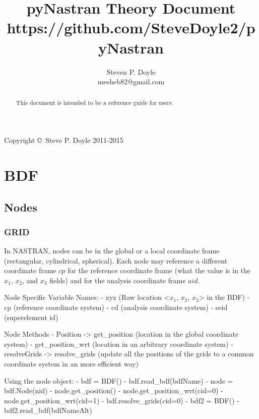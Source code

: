 
\title{pyNastran Theory Document \\
\small https://github.com/SteveDoyle2/pyNastran }
\author{Steven P. Doyle\\
{\small mesheb82@gmail.com}
}

\maketitle

\begin{abstract}
This document is intended to be a reference guide for users.
\end{abstract}

Copyright \copyright\ Steve P. Doyle 2011-2015
\newpage

\tableofcontents
\newpage

\section{BDF}

 \subsection{Nodes}
  \subsubsection{GRID}
     In NASTRAN, nodes can be in the global or a local coordinate
     frame (rectangular, cylindrical, spherical).  Each node may reference
     a different coordinate frame $cp$ for the reference coordinate frame
     (what the value is in the $x_1$, $x_2$, and $x_3$ fields) and for the
     analysis coordinate frame $aid$.

     Node Specific Variable Names:
      - xyz (Raw location <$x_1$, $x_2$, $x_3$> in the BDF)
      - cp (reference coordinate system)
      - cd (analysis  coordinate system)
      - seid (superelement id)

     Node Methods
      - Position -> get_position (location in the global coordinate system)
      - get_position_wrt  (location in an arbitrary coordinate system)
      - resolveGrids -> resolve_grids (update all the positions of the grids to a common coordinate system in an more efficient way)

     Using the node object:
      - bdf = BDF()
      - bdf.read_bdf(bdfName)
      - node = bdf.Node(nid)
      - node.get_position()            %
      - node.get_position_wrt(cid=0)   %
      - node.get_position_wrt(cid=1)   %
      - bdf.resolve_grids(cid=0) %
      - bdf2 = BDF()
      - bdf2.read_bdf(bdfNameAlt)

